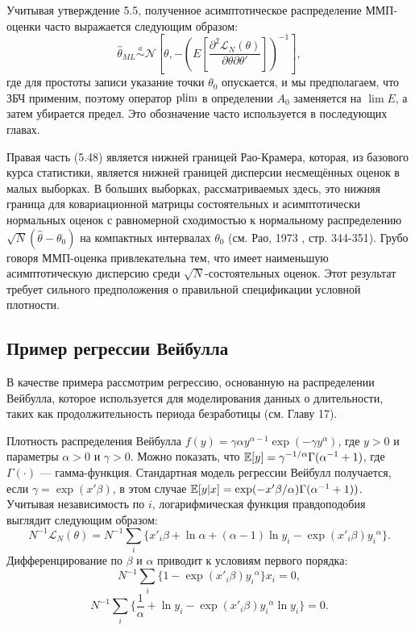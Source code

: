 Учитывая утверждение 5.5, полученное асимптотическое распределение ММП-оценки  часто выражается следующим образом:
\begin{equation}
\hat{\theta}_{ML} \stackrel{a}{\sim} \mathcal{N} \left[ \theta, - \left( E \left[ \frac{\partial^2 \mathcal{L}_{N}(\theta)}{\partial \theta \partial \theta'} \right] \right) ^{-1} \right],
\end{equation}
где для простоты записи указание точки $\theta_0$ опускается, и мы предполагаем, что ЗБЧ применим, поэтому оператор $\mathrm{plim }$ в определении $A_0$ заменяется на $\lim E$, а затем убирается предел. Это обозначение часто используется в последующих главах.

Правая часть (5.48) является нижней границей Рао-Крамера, которая, из базового курса статистики, является нижней границей дисперсии несмещённых оценок в малых выборках. В больших выборках, рассматриваемых здесь, это нижняя граница для ковариационной матрицы состоятельных и асимптотически нормальных оценок с равномерной сходимостью к нормальному распределению $\sqrt{N}(\hat{\theta}-\theta_0)$  на компактных интервалах $\theta_0$ (см. Рао, 1973 , стр. 344-351). Грубо говоря ММП-оценка привлекательна тем, что имеет наименьшую асимптотическую дисперсию среди $\sqrt{N}$-состоятельных оценок. Этот результат требует сильного предположения о правильной спецификации условной плотности.

\subsection{Пример регрессии Вейбулла}

В качестве примера рассмотрим регрессию, основанную на распределении Вейбулла, которое используется для моделирования данных о длительности, таких как продолжительность периода безработицы (см. Главу 17).

Плотность распределения Вейбулла $f(y)=\gamma \alpha y^{\alpha-1}\exp(-\gamma y^{\alpha})$, где $y>0$ и параметры $\alpha>0$ и $\gamma>0$. Можно показать, что $\mathbb{E}[y] = \gamma^{-1/\alpha} \Gamma( \alpha^{-1}+1)$, где $\Gamma(\cdot)$ --- гамма-функция. Стандартная модель регрессии Вейбулл получается, если  $\gamma=\exp(x'\beta)$, в этом случае $\mathbb{E}[y|x]= \exp(-x' \beta/ \alpha) \Gamma(\alpha^{-1}+1))$. Учитывая независимость по $i$, логарифмическая функция правдоподобия выглядит следующим образом:
\[
N^{-1} \mathcal{L}_{N}(\theta)= N^{-1} \sum_i \{x'_i \beta + \ln\alpha + (\alpha-1)\ln y_i - \exp(x'_i\beta){y_i}^{\alpha} \}.
\]
Дифференцирование по $\beta$ и $\alpha$ приводит к условиям первого порядка:
\[
N^{-1} \sum_i \{1- \exp(x'_i\beta){y_i}^{\alpha} \} x_i=0, 
\]
\[
N^{-1} \sum_i \{\frac{1}{\alpha}+\ln y_i- \exp(x'_i\beta){y_i}^{\alpha}\ln y_i \}=0.
\]

